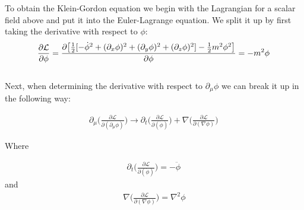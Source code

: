 \documentclass[aps,secnumarabic,nobalancelastpage,amsmath,amssymb,
nofootinbib]{revtex4}
\newcommand{\Lagr}{\mathcal{L}}
\begin{document}
To obtain the Klein-Gordon equation we begin with the Lagrangian for a scalar field above and put it into the Euler-Lagrange equation. We split it up by first taking the derivative with respect to $\phi$:
\begin{equation}
\frac{\partial \Lagr}{\partial \phi} = \frac{\partial \big[\normalfont\frac{1}{2} [-\dot{\phi}^2 + (\partial_x \phi)^2+(\partial_y \phi)^2+(\partial_z \phi)^2] - \frac{1}{2} m^2 \phi^2\big]\normalfont}{\partial \phi} =-m^2 \phi
\, 
\label{eq:12}
\end{equation}
\\
\noindent Next, when determining the derivative with respect to $\partial_\mu \phi$ we 
can break it up in the following way:

\begin{equation}
\begin{split}
  \partial_\mu \bigg(\frac{ \partial \Lagr}{ \partial (\partial_\mu \phi) }\bigg)
\rightarrow   \partial_t \bigg(\frac{ \partial \Lagr}{ \partial ( \dot{\phi}) }\bigg) + \nabla \bigg(\frac{ \partial \Lagr}{ \partial ( \nabla\phi) }\bigg)
\, \label{eq:13}
\end{split}
\end{equation}

\noindent Where

\begin{equation}
\begin{split}
\partial_t \bigg(\frac{ \partial \Lagr}{ \partial ( \dot{\phi}) }\bigg) = - \ddot{\phi}
\, \label{eq:14}
\end{split}
\end{equation}
\noindent and
\begin{equation}
\begin{split}
\nabla \bigg(\frac{ \partial \Lagr}{ \partial ( \nabla\phi) }\bigg) = \nabla^2 \phi \\
\, \label{eq:15}
\end{split}
\end{equation}


\end{document}
